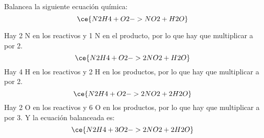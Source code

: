 Balancea la siguiente ecuación química:
\[  \ce{N2H4 + O2 -> NO2 + H2O}\]

\begin{solutionbox}{7cm}
    Hay 2 N en los reactivos y 1 N en el producto, por lo que hay que multiplicar a  por 2.
    \[\ce{N2H4 + O2 -> 2NO2 + H2O}\]
    Hay 4 H en los reactivos y 2 H en los productos, por lo que hay que multiplicar a  por 2.
    \[\ce{N2H4 + O2 -> 2NO2 + 2H2O}\]
    Hay 2 O en los reactivos y 6 O en los productos, por lo que hay que multiplicar a  por 3. Y la ecuación balanceada es:
    \[\ce{N2H4 + 3O2 -> 2NO2 + 2H2O}\]
\end{solutionbox}